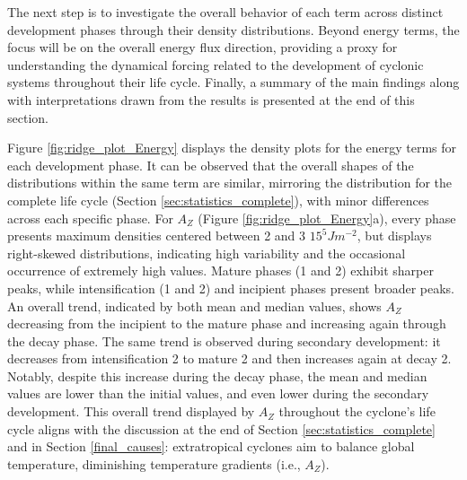 The next step is to investigate the overall behavior of each term across distinct development phases through their density distributions. Beyond energy terms, the focus will be on the overall energy flux direction, providing a proxy for understanding the dynamical forcing related to the development of cyclonic systems throughout their life cycle. Finally, a summary of the main findings along with interpretations drawn from the results is presented at the end of this section.

Figure \ref{fig:ridge_plot_Energy} displays the density plots for the energy terms for each development phase. It can be observed that the overall shapes of the distributions within the same term are similar, mirroring the distribution for the complete life cycle (Section \ref{sec:statistics_complete}), with minor differences across each specific phase. For $A_Z$ (Figure \ref{fig:ridge_plot_Energy}a), every phase presents maximum densities centered between 2 and 3 $15^5 J m^{-2}$, but displays right-skewed distributions, indicating high variability and the occasional occurrence of extremely high values. Mature phases (1 and 2) exhibit sharper peaks, while intensification (1 and 2) and incipient phases present broader peaks. An overall trend, indicated by both mean and median values, shows $A_Z$ decreasing from the incipient to the mature phase and increasing again through the decay phase. The same trend is observed during secondary development: it decreases from intensification 2 to mature 2 and then increases again at decay 2. Notably, despite this increase during the decay phase, the mean and median values are lower than the initial values, and even lower during the secondary development. This overall trend displayed by $A_Z$ throughout the cyclone's life cycle aligns with the discussion at the end of Section \ref{sec:statistics_complete} and in Section \ref{final_causes}: extratropical cyclones aim to balance global temperature, diminishing temperature gradients (i.e., $A_Z$).

